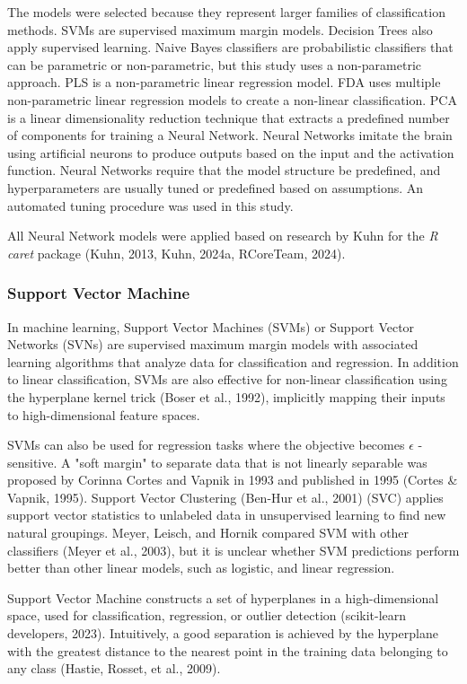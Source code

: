 \documentclass[sn-mathphys-num]{sn-jnl}%
\begin{document}
The models were selected because they represent larger families of classification methods. SVMs are supervised maximum margin models. Decision Trees also apply supervised learning. Naive Bayes classifiers are probabilistic classifiers that can be parametric or non-parametric, but this study uses a non-parametric approach. PLS is a non-parametric linear regression model. FDA uses multiple non-parametric linear regression models to create a non-linear classification. PCA is a linear dimensionality reduction technique that extracts a predefined number of components for training a Neural Network. Neural Networks imitate the brain using artificial neurons to produce outputs based on the input and the activation function. Neural Networks require that the model structure be predefined, and hyperparameters are usually tuned or predefined based on assumptions. An automated tuning procedure was used in this study.

All Neural Network models were applied based on research by Kuhn for the \textit{R} \textit{caret} package (Kuhn, 2013, Kuhn, 2024a, RCoreTeam, 2024).

\subsubsection{Support Vector Machine}

In machine learning, Support Vector Machines (SVMs) or Support Vector Networks (SVNs) are supervised maximum margin models with associated learning algorithms that analyze data for classification and regression. In addition to linear classification, SVMs are also effective for non-linear classification using the hyperplane kernel trick (Boser et al., 1992), implicitly mapping their inputs to high-dimensional feature spaces.

SVMs can also be used for regression tasks where the objective becomes $\epsilon$ -sensitive. A "soft margin" to separate data that is not linearly separable was proposed by Corinna Cortes and Vapnik in 1993 and published in 1995 (Cortes & Vapnik, 1995). Support Vector Clustering (Ben-Hur et al., 2001) (SVC) applies support vector statistics to unlabeled data in unsupervised learning to find new natural groupings. Meyer, Leisch, and Hornik compared SVM with other classifiers (Meyer et al., 2003), but it is unclear whether SVM predictions perform better than other linear models, such as logistic, and linear regression.

Support Vector Machine constructs a set of hyperplanes in a high-dimensional space, used for classification, regression, or outlier detection (scikit-learn developers, 2023). Intuitively, a good separation is achieved by the hyperplane with the greatest distance to the nearest point in the training data belonging to any class (Hastie, Rosset, et al., 2009).
\end{document}
